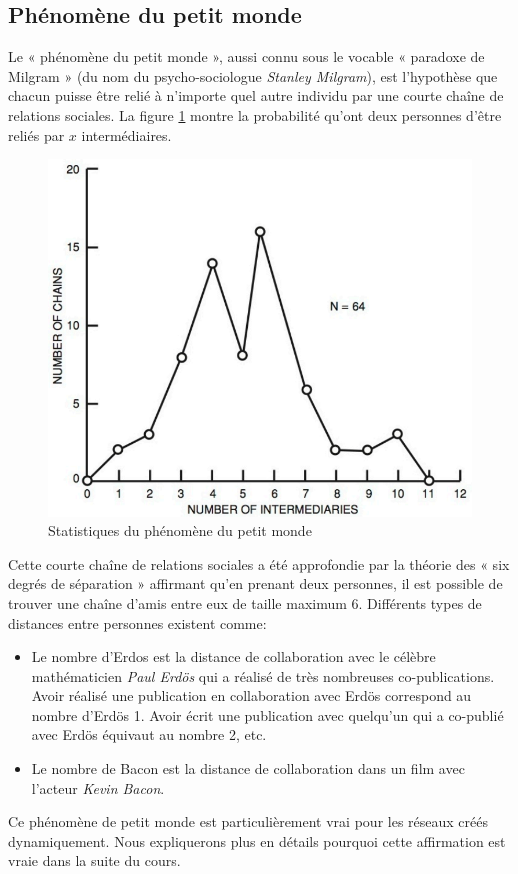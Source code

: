\subsection{Phénomène du petit monde}
Le « phénomène du petit monde », aussi connu sous le vocable « paradoxe de Milgram » (du nom du psycho-sociologue  \textit{Stanley Milgram}), est l'hypothèse que chacun puisse être relié à n'importe quel autre individu par une courte chaîne de relations sociales. La figure \ref{petit_monde} montre la probabilité qu'ont deux personnes d'être reliés par $x$ intermédiaires. 
	\begin{figure}
	\center
	\includegraphics[scale=1]{images/18_fig.png}
	\caption{\label{petit_monde} Statistiques du phénomène du petit monde}
	\end{figure}
Cette  courte chaîne de relations sociales a été approfondie par la théorie des « six degrés de séparation » affirmant qu'en prenant deux personnes, il est possible de trouver une chaîne d'amis entre eux de taille maximum 6.
Différents types de distances entre personnes existent comme:
	\begin{itemize}
	\item Le nombre d'Erdos est la distance de collaboration avec le célèbre mathématicien  \textit{Paul Erdös} qui a réalisé de très nombreuses co-publications. Avoir réalisé une publication en collaboration avec Erdös correspond au nombre d'Erdös 1. Avoir écrit une publication avec quelqu'un qui a co-publié avec Erdös équivaut au nombre 2, etc.
	\item Le nombre de Bacon est la distance de collaboration dans un film avec l'acteur  \textit{Kevin Bacon}.
	\end{itemize}
Ce phénomène de petit monde est particulièrement vrai pour les réseaux créés dynamiquement. Nous expliquerons plus en détails pourquoi cette affirmation est vraie dans la suite du cours.

